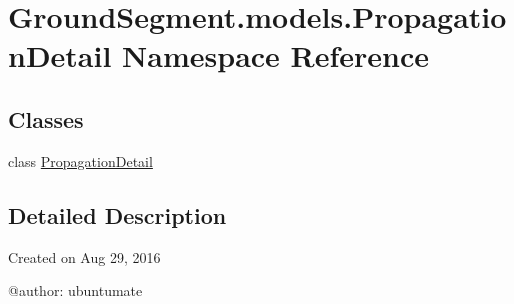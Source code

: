 \hypertarget{namespace_ground_segment_1_1models_1_1_propagation_detail}{}\section{Ground\+Segment.\+models.\+Propagation\+Detail Namespace Reference}
\label{namespace_ground_segment_1_1models_1_1_propagation_detail}
\subsection*{Classes}
\begin{DoxyCompactItemize}
\item 
class \hyperlink{class_ground_segment_1_1models_1_1_propagation_detail_1_1_propagation_detail}{Propagation\+Detail}
\end{DoxyCompactItemize}


\subsection{Detailed Description}
\begin{DoxyVerb}Created on Aug 29, 2016

@author: ubuntumate
\end{DoxyVerb}
 
